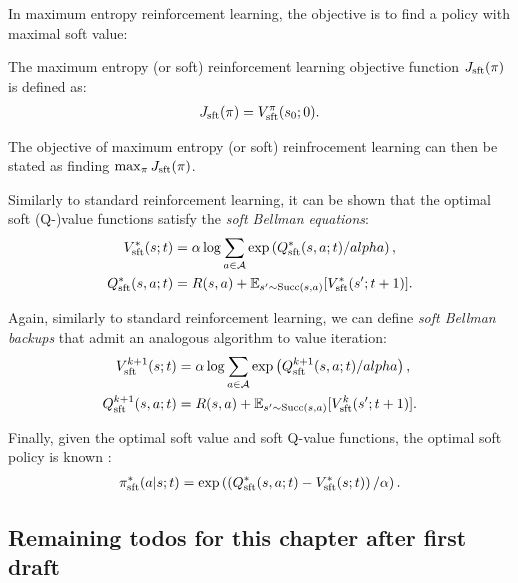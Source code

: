         In maximum entropy reinforcement learning, the objective is to find a policy with maximal soft value:
        \begin{defn}
            The \textnormal{maximum entropy (or soft) reinforcement learning objective function} $J_{\textnormal{sft}}(\pi)$ is defined as:
            \begin{align}
                J_{\textnormal{sft}}(\pi) = V_{\textnormal{sft}}^{\pi}(s_0;0).
            \end{align}

            The objective of maximum entropy (or soft) reinfrocement learning can then be stated as finding $\max_{\pi} J_{\textnormal{sft}}(\pi)$.
        \end{defn}

        Similarly to standard reinforcement learning, it can be shown  that the optimal soft (Q-)value functions satisfy the \textit{soft Bellman equations}:
        \begin{align}
            V_{\textnormal{sft}}^*(s;t) &= \alpha \log \sum_{a\in\mathcal{A}} \exp\left( Q_{\textnormal{sft}}^*(s,a;t) / alpha \right), \\
            Q_{\textnormal{sft}}^*(s,a;t) &= R(s,a) + \mathbb{E}_{s'\sim \textnormal{Succ}(s,a)} [V_{\textnormal{sft}}^*(s';t+1)].
        \end{align} 

        Again, similarly to standard reinforcement learning, we can define \textit{soft Bellman backups} that admit an analogous algorithm to value iteration:
        \begin{align}
            V_{\textnormal{sft}}^{k+1}(s;t) &= \alpha \log \sum_{a\in\mathcal{A}} \exp\left( Q_{\textnormal{sft}}^{k+1}(s,a;t) / alpha \right), \\
            Q_{\textnormal{sft}}^{k+1}(s,a;t) &= R(s,a) + \mathbb{E}_{s'\sim \textnormal{Succ}(s,a)} [V_{\textnormal{sft}}^k(s';t+1)].
        \end{align}

        Finally, given the optimal soft value and soft Q-value functions, the optimal soft policy is known :
        \begin{align}
            \pi_{\textnormal{sft}}^*(a|s;t) = \exp\left(\left(Q_{\textnormal{sft}}^*(s,a;t) - V_{\textnormal{sft}}^*(s;t)\right) / \alpha \right).
        \end{align}

    \subsection{Remaining todos for this chapter after first draft}



